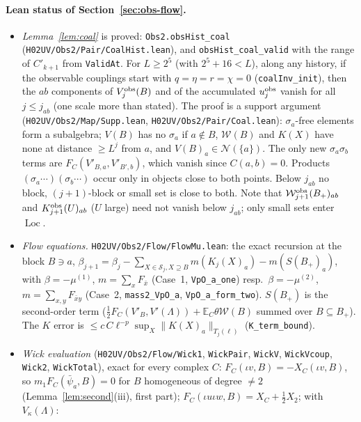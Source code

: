 \documentclass[11pt]{amsart}
\theoremstyle{definition}
\theoremstyle{remark}
\numberwithin{equation}{section}
\newcommand{\E}{\mathbb{E}}
\newcommand{\cS}{\mathcal{S}}
\newcommand{\Loc}{\operatorname{Loc}}
\begin{document}
\paragraph{Lean status of Section~\ref{sec:obs-flow}.}
\begin{itemize}
\item \emph{Lemma~\ref{lem:coal}} is proved: \texttt{Obs2.obsHist\_coal} (\texttt{H02UV/Obs2/Pair/CoalHist.lean}),
  and \texttt{obsHist\_coal\_valid} with the range of $C'_{k+1}$ from \texttt{ValidAt}. For $L\ge 2^5$
  (with $2^5+16<L$), along any history, if the observable couplings start with $q=\eta=r=\chi=0$
  (\texttt{coalInv\_init}), then the $ab$ components of $V^{\rm obs}_j(B)$ and of the accumulated
  $u^{\rm obs}_j$ vanish for all $j\le j_{ab}$ (one scale more than stated). The proof is a support
  argument (\texttt{H02UV/Obs2/Map/Supp.lean}, \texttt{H02UV/Obs2/Pair/Coal.lean}): $\sigma_a$-free elements form a
  subalgebra; $V(B)$ has no $\sigma_a$ if $a\notin B$, $\mathcal W(B)$ and $K(X)$ have none at distance
  $\ge L^j$ from $a$, and $V(B)_a\in\mathcal N(\{a\})$. The only new $\sigma_a\sigma_b$ terms are
  $F_C(V'_{B,a},V'_{B',b})$, which vanish since $C(a,b)=0$. Products $(\sigma_a\cdots)(\sigma_b\cdots)$
  occur only in objects close to both points. Below $j_{ab}$ no block, $(j+1)$-block or small set is
  close to both. Note that $\mathcal W^{\rm obs}_{j+1}(B_+)_{ab}$ and $K^{\rm obs}_{j+1}(U)_{ab}$
  ($U$ large) need not vanish below $j_{ab}$; only small sets enter $\Loc$.
\item \emph{Flow equations.} \texttt{H02UV/Obs2/Flow/FlowMu.lean}: the exact recursion at the block $B\ni a$,
  $\beta_{j+1}=\beta_j-\sum_{X\in\cS_j,X\supseteq B}m(K_j(X)_a)-m(S(B_+)_a)$, with $\beta=-\mu^{(1)}$,
  $m=\sum_xF_{\bar x}$ (Case~1, \texttt{VpO\_a\_one}) resp.\ $\beta=-\mu^{(2)}$, $m=\sum_{x,y}F_{\bar xy}$
  (Case~2, \texttt{mass2\_VpO\_a}, \texttt{VpO\_a\_form\_two}). $S(B_+)$ is the second-order term
  ($\frac12F_C(V'_B,V'(\Lambda))+\E_C\theta\mathcal W(B)$ summed over $B\subseteq B_+$). The $K$ error is
  $\le c\,C\ell^{-p}\sup_X\|K(X)_a\|_{T_j(\ell)}$ (\texttt{K\_term\_bound}). 
\item \emph{Wick evaluation} (\texttt{H02UV/Obs2/Flow/Wick1}, \texttt{WickPair}, \texttt{WickV}, \texttt{WickVcoup},
  \texttt{Wick2}, \texttt{WickTotal}), exact for every complex $C$: $F_C(\iota v,B)=-X_C(\iota v,B)$, so
  $m_1F_C(\bar\psi_a,B)=0$ for $B$ homogeneous of degree $\ne2$ (Lemma~\ref{lem:second}(iii), first part);
  $F_C(\iota u\iota w,B)=X_C+\frac12X_2$; with $V_\kappa(\Lambda)$:

\end{itemize}
\end{document}
